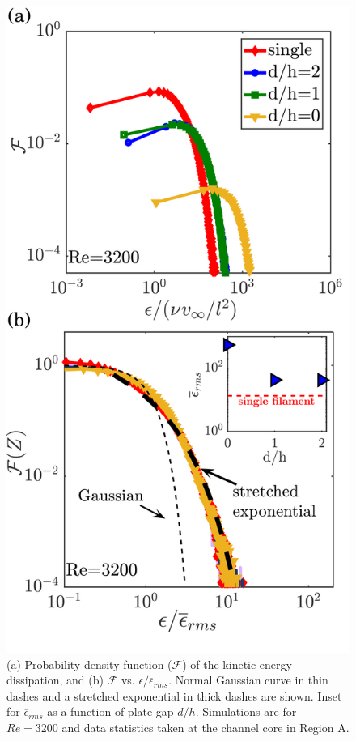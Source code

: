\documentclass[aps,pre,twocolumn,aps,longbibliography]{revtex4-1}
\begin{document}
	\begin{figure}
		\begin{minipage}[c]{1\linewidth}
			\includegraphics[width=0.90\linewidth]{Fig18.pdf} 
		\end{minipage} 
		\caption{(a) Probability density function ($\mathcal{F}$) of the kinetic energy dissipation, and (b) $\mathcal{F}$ vs. $\epsilon/\overline{\epsilon}_{rms}$. Normal Gaussian curve in thin dashes and a stretched exponential in thick dashes are shown. Inset for $\overline{\epsilon}_{rms}$ as a function of plate gap $d/h$. Simulations are for $Re=3200$ and data statistics taken at the channel core in Region A.}
		\label{fig:doublefil_Re3200}
	\end{figure}
	
\end{document}
